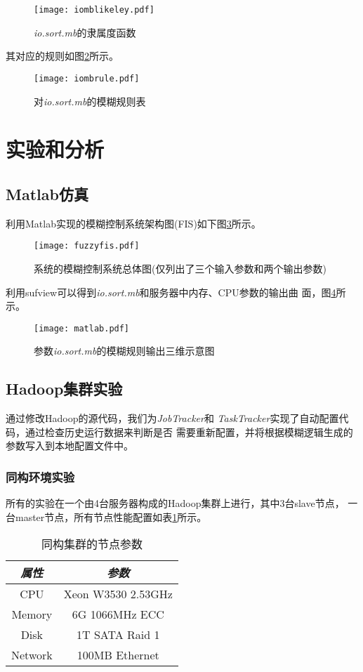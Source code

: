 \begin{figure}[h!]
  \centering
  \texttt{[image: iomblikeley.pdf]}
  \caption{\textit{io.sort.mb}的隶属度函数}
  \label{fig:iomblikely}
\end{figure}

其对应的规则如图\ref{fig:iombrule}所示。

\begin{figure}[h!]
  \centering
  \texttt{[image: iombrule.pdf]}
  \caption{对\textit{io.sort.mb}的模糊规则表}
  \label{fig:iombrule}
\end{figure}

\section{实验和分析}
\subsection{Matlab仿真}
利用Matlab实现的模糊控制系统架构图(FIS)如下图\ref{fig:fis}所示。
\begin{figure}[h!]
  \centering
  \texttt{[image: fuzzyfis.pdf]}
  \caption{系统的模糊控制系统总体图(仅列出了三个输入参数和两个输出参数)}
  \label{fig:fis}
\end{figure}
利用sufview可以得到\textit{io.sort.mb}和服务器中内存、CPU参数的输出曲
面，图\ref{fig:matlab}所示。
\begin{figure}[h!]
  \centering
  \texttt{[image: matlab.pdf]}
  \caption{参数\textit{io.sort.mb}的模糊规则输出三维示意图}
  \label{fig:matlab}
\end{figure}

\subsection{Hadoop集群实验}
通过修改Hadoop的源代码，我们为\textit{JobTracker}和
\textit{TaskTracker}实现了自动配置代码，通过检查历史运行数据来判断是否
需要重新配置，并将根据模糊逻辑生成的参数写入到本地配置文件中。

\subsubsection{同构环境实验}

所有的实验在一个由4台服务器构成的Hadoop集群上进行，其中3台slave节点，
一台master节点，所有节点性能配置如表\ref{table:machines}所示。

\begin{table}[h!]\small
  \caption{同构集群的节点参数}
  \label{table:machines}
  \centering
  \begin{tabular}{|c|c|}
    \hline
    \textit{属性} & \textit{参数} \\
    \hline
    CPU & Xeon W3530 2.53GHz\\
    \hline
    Memory & 6G 1066MHz ECC\\
    \hline
    Disk & 1T SATA Raid 1\\
    \hline
    Network & 100MB Ethernet\\
    \hline
  \end{tabular}
\end{table}

